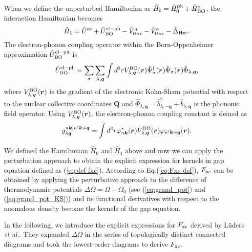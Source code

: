 When we define the unperturbed Hamiltonian as $\hat{H}_0 = \hat{H}^{\rm ph}_0 + \hat{H}^{\rm e}_{\rm BO}$,
the interaction Hamiltonian becomes
%
\begin{equation}
	\hat{H}_1 = \hat{U}^{\rm ee} + \hat{U}^{\rm el-ph}_{\rm BO} - \hat{V}^{\rm n}_{\rm Hxc}
	- \hat{V}^{\rm e}_{\rm Hxc} - \hat{\Delta}_{\rm Hxc}.
	\label{eq:int_Hamil}
\end{equation}
%
The electron-phonon coupling operator within the Born-Oppenheimer approximation
$\hat{U}^{\rm el-ph}_{\rm BO}$ is 
%
\begin{equation}
	\hat{U}^{\rm el-ph}_{\rm BO} = \sum_{\sigma} \sum_{\lambda,{\bm q}}
	\int d^3r V^{\rm BO}_{\lambda, {\bm q}}({\bm r})
	\hat{\Psi}^\dag_\sigma({\bm r}) \hat{\Psi}_\sigma({\bm r})
	\hat{\Phi}_{\lambda, {\bm q}},
	\label{eq:el-ph-coup-ope}
\end{equation}
%
where $V^{\rm BO}_{\lambda, {\bm q}}({\bm r})$ is the gradient of the electronic Kohn-Sham potential
with respect to the nuclear collective coordinates $\bm Q$ and 
$\hat{\Phi}_{\lambda, {\bm q}} = \hat{b}^\dag_{\lambda,-{\bm q}} + \hat{b}_{\lambda, {\bm q}}$ is the
phononic field operator.
Using $V^{\rm BO}_{\lambda, {\bm q}}({\bm r})$, the electron-phonon coupling constant is deined as 
%
\begin{equation}
	g^{n{\bm k},n'{\bm k}+{\bm q}}_{\lambda {\bm q}} = \int d^3r \varphi^\ast_{n{\bm k}}({\bm r})
	V^{\rm BO}_{\lambda, {\bm q}}({\bm r})\varphi_{n'{\bm k}+{\bm q}}({\bm r}).
	\label{eq:el-ph-coup-g}
\end{equation}
%

We defined the Hamiltonian $\hat{H}_0$ and $\hat{H}_1$ above and now we can apply the perturbation
approach to obtain the explicit expression for kernels in gap equation defined as
(\ref{eq:def-fxc}).
According to Eq.(\ref{eq:Fxc-def}),
$F_{\rm xc}$ can be obtained by applying the perturbative approach to the difference of 
thermodynamic potentials $\Delta\Omega = \Omega - \Omega_0$ 
(see (\ref{eq:grand_pot}) and (\ref{eq:grand_pot_KS}))
and its functional derivatives with respect to the anomalous density become the kernels of the 
gap equation.

In the following, we introduce the explicit expressions for $F_{\rm xc}$ derived by L\"{u}ders {\it et al.}\cite{Luders2005}.
They expanded $\Delta\Omega$ in the series of topologically distinct connected diagrams 
and took the lowest-order diagrams to derive $F_{\rm xc}$.

